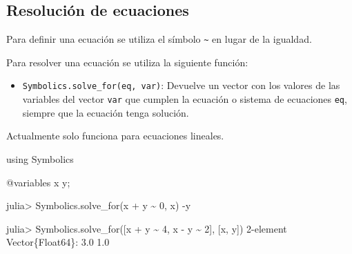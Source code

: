 \documentclass[
  letterpaper,
  DIV=11,
  numbers=noendperiod]{scrreprt}
\newenvironment{Shaded}{\begin{snugshade}}{\end{snugshade}}
\newcommand{\BuiltInTok}[1]{\textcolor[rgb]{0.00,0.23,0.31}{#1}}
\newcommand{\DataTypeTok}[1]{\textcolor[rgb]{0.68,0.00,0.00}{#1}}
\newcommand{\FloatTok}[1]{\textcolor[rgb]{0.68,0.00,0.00}{#1}}
\newcommand{\FunctionTok}[1]{\textcolor[rgb]{0.28,0.35,0.67}{#1}}
\newcommand{\ImportTok}[1]{\textcolor[rgb]{0.00,0.46,0.62}{#1}}
\newcommand{\NormalTok}[1]{\textcolor[rgb]{0.00,0.23,0.31}{#1}}
\newcommand{\OperatorTok}[1]{\textcolor[rgb]{0.37,0.37,0.37}{#1}}
\newcommand{\PreprocessorTok}[1]{\textcolor[rgb]{0.68,0.00,0.00}{#1}}
\providecommand{\tightlist}{%
  \setlength{\itemsep}{0pt}\setlength{\parskip}{0pt}}\usepackage{longtable,booktabs,array}
\begin{document}
\hypertarget{resoluciuxf3n-de-ecuaciones}{%
\subsection{Resolución de
ecuaciones}\label{resoluciuxf3n-de-ecuaciones}}

Para definir una ecuación se utiliza el símbolo
\texttt{\textasciitilde{}} en lugar de la igualdad.

Para resolver una ecuación se utiliza la siguiente función:

\begin{itemize}
\tightlist
\item
  \texttt{Symbolics.solve\_for(eq,\ var)}: Devuelve un vector con los
  valores de las variables del vector \texttt{var} que cumplen la
  ecuación o sistema de ecuaciones \texttt{eq}, siempre que la ecuación
  tenga solución.
\end{itemize}

\begin{tcolorbox}[enhanced jigsaw, colbacktitle=quarto-callout-warning-color!10!white, coltitle=black, opacityback=0, opacitybacktitle=0.6, bottomtitle=1mm, leftrule=.75mm, toprule=.15mm, bottomrule=.15mm, toptitle=1mm, breakable, colframe=quarto-callout-warning-color-frame, colback=white, rightrule=.15mm, titlerule=0mm, title=\textcolor{quarto-callout-warning-color}{\faExclamationTriangle}\hspace{0.5em}{Warning}, arc=.35mm, left=2mm]
Actualmente solo funciona para ecuaciones lineales.
\end{tcolorbox}

\begin{Shaded}
\begin{Highlighting}[]
\ImportTok{using} \BuiltInTok{Symbolics}

\PreprocessorTok{@variables}\NormalTok{ x y;}

\NormalTok{julia}\OperatorTok{\textgreater{}}\NormalTok{ Symbolics.}\FunctionTok{solve\_for}\NormalTok{(x }\OperatorTok{+}\NormalTok{ y }\OperatorTok{\textasciitilde{}} \FloatTok{0}\NormalTok{, x)}
\OperatorTok{{-}}\NormalTok{y}

\NormalTok{julia}\OperatorTok{\textgreater{}}\NormalTok{ Symbolics.}\FunctionTok{solve\_for}\NormalTok{([x }\OperatorTok{+}\NormalTok{ y }\OperatorTok{\textasciitilde{}} \FloatTok{4}\NormalTok{, x }\OperatorTok{{-}}\NormalTok{ y }\OperatorTok{\textasciitilde{}} \FloatTok{2}\NormalTok{], [x, y])}
\FloatTok{2}\OperatorTok{{-}}\NormalTok{element }\DataTypeTok{Vector}\NormalTok{\{}\DataTypeTok{Float64}\NormalTok{\}}\OperatorTok{:}
 \FloatTok{3.0}
 \FloatTok{1.0}
\end{Highlighting}
\end{Shaded}
\end{document}
